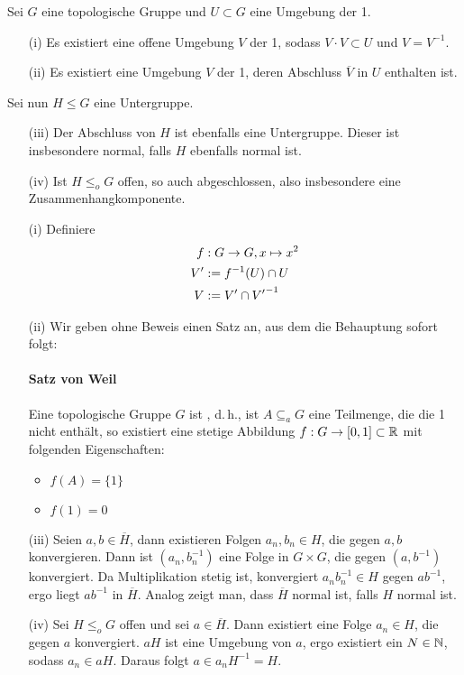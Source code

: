 \documentclass{book}
\renewcommand{\i}{^{-1}}
\begin{document}
\Prop{}
\label{Prop4}
Sei $G$ eine topologische Gruppe und $U \subset G$ eine Umgebung der 1.
\begin{itemize}
\item[(i)] Es existiert eine offene Umgebung $V$ der 1, sodass $V\cdot V \subset U$ und $V = V\i$.
\item[(ii)] Es existiert eine Umgebung $V$ der 1, deren Abschluss $\overline{V}$ in $U$ enthalten ist.
\end{itemize}
Sei nun $H \leq G$ eine Untergruppe.
\begin{itemize}
\item[(iii)] Der Abschluss von $H$ ist ebenfalls eine Untergruppe. Dieser ist insbesondere normal, falls $H$ ebenfalls normal ist.
\item[(iv)] Ist $H \leq_o G$ offen, so auch abgeschlossen, also insbesondere eine Zusammenhangkomponente.
\end{itemize}
\begin{Beweis}{}
\begin{itemize}
\item[(i)] Definiere
\begin{align*}
f&: G \pfeil{} G, x \mapsto x^2\\
V' &:= f\i(U) \cap U\\
V &:= V' \cap {V'}\i
\end{align*}
\item[(ii)] Wir geben ohne Beweis einen Satz an, aus dem die Behauptung sofort folgt:
\paragraph{Satz von Weil}
Eine topologische Gruppe $G$ ist , d.\,h., ist $A\subseteq_aG$ eine Teilmenge, die die 1 nicht enthält, so existiert eine stetige Abbildung $f : G \overset{}{\rightarrow} [0,1] \subset \mathbb{R}$ mit folgenden Eigenschaften:
\begin{itemize}
\item $f(A) = \{1\}$
\item $f(1) = 0$
\end{itemize}
\item[(iii)] Seien $a,b \in \overline{H}$, dann existieren Folgen $a_n,b_n \in H$, die gegen $a,b$ konvergieren. Dann ist $(a_n,b_n\i)$ eine Folge in $G\times G$, die gegen $(a,b\i)$ konvergiert. Da Multiplikation stetig ist, konvergiert $a_nb_n\i \in H$ gegen $ab\i$, ergo liegt $ab\i$ in $\overline{H}$. Analog zeigt man, dass $\overline{H}$ normal ist, falls $H$ normal ist.
\item[(iv)] Sei $H \leq_o G$ offen und sei $a \in \overline{H}$. Dann existiert eine Folge $a_n \in H$, die gegen $a$ konvergiert. $aH$ ist eine Umgebung von $a$, ergo existiert ein $N \in \mathbb{N}$, sodass $a_n \in aH$. Daraus folgt $a \in a_nH\i = H$.
\end{itemize}
\end{Beweis}
\end{document}
